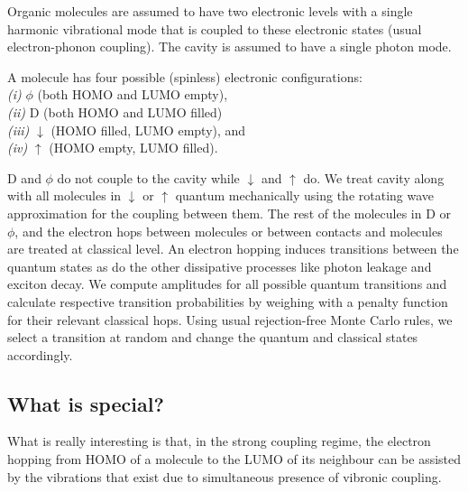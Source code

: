 \documentclass[a4paper,twocolumn]{revtex4-1} %
\newcommand{\da}{\downarrow}
\newcommand{\ua}{\uparrow}
\begin{document}

Organic molecules are %
assumed to have two electronic levels with a single harmonic vibrational mode that is coupled to these electronic states (usual electron-phonon coupling). 
The cavity is %
assumed to have a single photon mode.


A molecule has four possible (spinless) electronic configurations:
\\{\it (i)} $\phi$ (both HOMO and LUMO empty), 
\\{\it (ii)} D (both HOMO and LUMO filled)
\\{\it (iii)} $\da$ (HOMO filled, LUMO empty), and 
\\{\it (iv)} $\ua$ (HOMO empty, LUMO filled).

D and $\phi$ do not couple to the cavity while $\da$ and $\ua$ do. 
We treat cavity along with all molecules in $\da$ or $\ua$ 
quantum mechanically using the rotating wave approximation for the coupling between them.
The rest of the molecules in D or $\phi$, and the electron hops 
between molecules or between contacts and molecules
are treated at classical level.
An electron hopping induces transitions between the quantum states as do the other dissipative processes like photon leakage and exciton decay.
We compute amplitudes for all possible quantum transitions 
and calculate respective transition probabilities
by weighing with a penalty function for their 
relevant classical hops.
Using usual rejection-free Monte Carlo rules, we select a transition at random and change the quantum and classical states accordingly.

\subsection{What is special?}
What is really interesting is that, in the strong coupling regime, the  electron hopping from HOMO of a molecule to the LUMO of its neighbour can be assisted by the vibrations that exist due to simultaneous presence of %
vibronic coupling.
\end{document}
